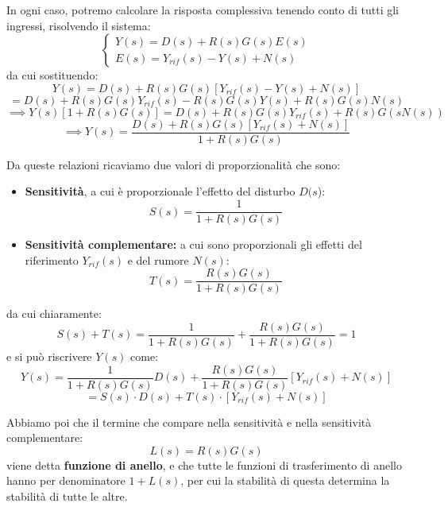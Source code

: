\documentclass[a4paper,11pt]{article}
\begin{document}
In ogni caso, potremo calcolare la risposta complessiva tenendo conto di tutti gli ingressi, risolvendo il sistema:
\[
	\begin{cases}
		Y(s) = D(s) + R(s) G(s) E(s) \\
		E(s) = Y_{rif}(s) - Y(s) + N(s)
	\end{cases}
\]
da cui sostituendo:
$$
Y(s) = D(s) + R(s) G(s) \left[ Y_{rif}(s) - Y(s) + N(s) \right]
$$
$$
= D(s) + R(s) G(s) Y_{rif}(s) - R(s) G(s) Y(s) + R(s) G(s) N(s)
$$
$$
\implies Y(s) \left[ 1 + R(s) G(s) \right] = D(s) + R(s) G(s) Y_{rif}(s) + R(s) G(s N(s))
$$
$$
\implies Y(s) = \frac{ D(s) + R(s) G(s) \left[ Y_{rif}(s) + N(s) \right] }{ 1 + R(s) G(s) }
$$

Da queste relazioni ricaviamo due valori di proporzionalità che sono:
\begin{itemize}
	\item \textbf{Sensitività}, a cui è proporzionale l'effetto del disturbo $D(s$): 
		$$
		S(s) = \frac{1}{1 + R(s) G(s)}
		$$
	\item \textbf{Sensitività complementare:} a cui sono proporzionali gli effetti del riferimento $Y_{rif}(s)$ e del rumore $N(s)$:
		$$
		T(s) = \frac{R(s) G(s)}{1 + R(s) G(s)}
		$$
\end{itemize}
da cui chiaramente:
$$
S(s) + T(s) = \frac{1}{1 + R(s) G(s)} + \frac{R(s) G(s)}{1 + R(s) G(s)} = 1
$$
e si può riscrivere $Y(s)$ come:
$$
Y(s) = \frac{1}{1 + R(s) G(s)} D(s) + \frac{R(s) G(s)}{1 + R(s) G(s)} \left[ Y_{rif}(s) + N(s) \right] 
$$
$$
= S(s) \cdot D(s) + T(s) \cdot \left[ Y_{rif}(s) + N(s) \right]
$$

Abbiamo poi che il termine che compare nella sensitività e nella sensitività complementare:
$$
L(s) = R(s) G(s)
$$
viene detta \textbf{funzione di anello}, e che tutte le funzioni di trasferimento di anello hanno per denominatore $1 + L(s)$, per cui la stabilità di questa determina la stabilità di tutte le altre.
\end{document}
